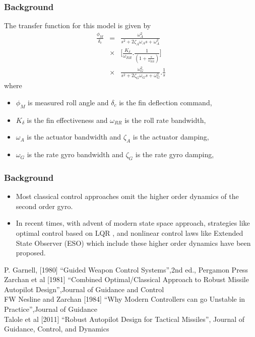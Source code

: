 \documentclass[10pt]{beamer}
\begin{document}
\begin{frame}
\frametitle{Background}
The transfer function for this model is given by
\begin{eqnarray}
\frac{\phi_M}{\delta_c}&=&\frac{\omega_A^2}{s^2+2\zeta_A \omega_A s+\omega_A^2}\\\nonumber
&\times&\bigg[\frac{K_\delta}{\omega_{RR}}.\frac{1}{(1+\frac{s}{\omega_{RR}})}\bigg]\\\nonumber
&\times&\frac{\omega_G^2}{s^2+2\zeta_G \omega_G s+\omega_G^2}.\frac{1}{s}\label{RollAPlqr5}
\end{eqnarray}
where
\begin{itemize}
 \item $\phi_M$ is measured roll angle and $\delta_c$ is the fin deflection command,
  \item $K_\delta$ is the fin effectiveness and $\omega_{RR}$ is the roll rate bandwidth,
 \item $\omega_A$ is the actuator bandwidth and $\zeta_A$ is the actuator damping,
 \item  $\omega_G$ is the rate gyro bandwidth and $\zeta_G$ is the rate gyro damping,
\end{itemize}

\vspace{.4cm}
\end{frame}
%
\begin{frame}
\frametitle{Background}
\begin{itemize}
 \item Most classical control approaches \cite{garnell} omit the higher order dynamics of the second order gyro.
  \item In recent times, with advent of modern state space approach, strategies like optimal control based on LQR \cite{zarchannesline81},\cite{zarchannesline1984} and nonlinear control laws like Extended State Observer (ESO) \cite{talolekolhe2011} which include these higher order dynamics have been proposed.
\end{itemize}
\vspace{.5cm}
\footnoterule
\tiny {\cite{garnell} P. Garnell, [1980] ``Guided Weapon Control Systems'',2nd ed., Pergamon Press} \\
\tiny {\cite{zarchannesline81} Zarchan et al [1981] ``Combined Optimal/Classical Approach to Robust Missile Autopilot Design'',Journal of Guidance and Control} \\
\tiny {\cite{zarchannesline1984} FW Nesline and Zarchan [1984] ``Why Modern Controllers can go Unstable in Practice'',Journal of Guidance} \\
\tiny {\cite{talolekolhe2011} Talole et al [2011] ``Robust Autopilot Design for Tactical Missiles'', Journal of Guidance, Control, and Dynamics}

\vspace{.4cm}
\end{frame}
%
\end{document}
